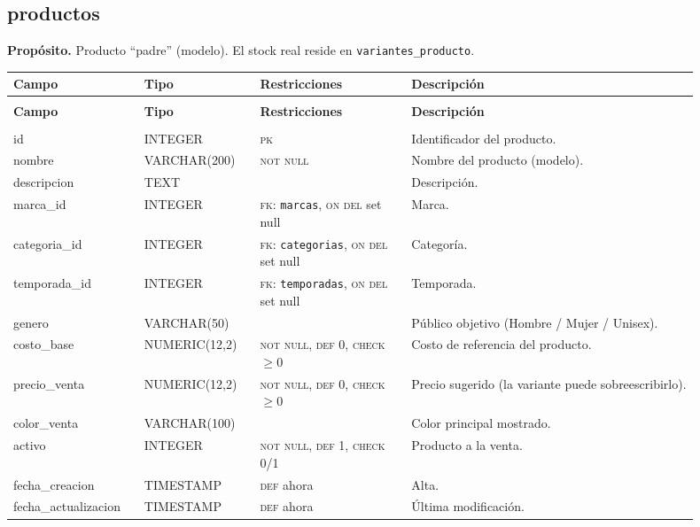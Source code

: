 \documentclass[11pt]{article}
\makeatletter
\newenvironment{campos}{%
  \par\footnotesize
  \setlength{\LTpre}{0.3ex}\setlength{\LTpost}{0.6ex}
  \begin{longtable}{@{}>{\ttfamily}p{0.165\linewidth} >{\ttfamily}p{0.150\linewidth} p{0.205\linewidth} >{\raggedright\arraybackslash}p{0.385\linewidth}@{}}
  \toprule
  \normalfont\bfseries Campo & \normalfont\bfseries Tipo & \normalfont\bfseries Restricciones & \normalfont\bfseries Descripción \\
  \midrule \endfirsthead
  \multicolumn{4}{@{}l}{\footnotesize\itshape \dots\ continuación}\\[0.3ex]
  \toprule
  \normalfont\bfseries Campo & \normalfont\bfseries Tipo & \normalfont\bfseries Restricciones & \normalfont\bfseries Descripción \\
  \midrule \endhead
  \midrule \multicolumn{4}{r@{}}{\footnotesize\itshape continúa en la siguiente página}\\ \endfoot
  \bottomrule \endlastfoot
}{%
  \end{longtable}\par
}
\newcommand{\proposito}[1]{\par\vspace{0.2ex}\noindent\colorbox{brandlight}{\parbox{\dimexpr\linewidth-2\fboxsep}{\small\textbf{Propósito.} #1}}\par\vspace{0.8ex}}
\newcommand{\pk}{\textsc{pk}}
\newcommand{\fk}[1]{\textsc{fk}: \texttt{#1}}
\newcommand{\nn}{\textsc{not null}}
\makeatother
\begin{document}
\subsection{productos}
\proposito{Producto ``padre'' (modelo). El stock real reside en \texttt{variantes\_producto}.}
\begin{campos}
id                  & INTEGER       & \pk{}    & Identificador del producto. \\
nombre              & VARCHAR(200)  & \nn      & Nombre del producto (modelo). \\
descripcion         & TEXT          &          & Descripción. \\
marca\_id           & INTEGER       & \fk{marcas}, \textsc{on del} set null & Marca. \\
categoria\_id       & INTEGER       & \fk{categorias}, \textsc{on del} set null & Categoría. \\
temporada\_id       & INTEGER       & \fk{temporadas}, \textsc{on del} set null & Temporada. \\
genero              & VARCHAR(50)   &          & Público objetivo (Hombre / Mujer / Unisex). \\
costo\_base         & NUMERIC(12,2) & \nn, \textsc{def} 0, \textsc{check} $\geq 0$ & Costo de referencia del producto. \\
precio\_venta       & NUMERIC(12,2) & \nn, \textsc{def} 0, \textsc{check} $\geq 0$ & Precio sugerido (la variante puede sobreescribirlo). \\
color\_venta        & VARCHAR(100)  &          & Color principal mostrado. \\
activo              & INTEGER       & \nn, \textsc{def} 1, \textsc{check} 0/1 & Producto a la venta. \\
fecha\_creacion     & TIMESTAMP     & \textsc{def} ahora & Alta. \\
fecha\_actualizacion & TIMESTAMP    & \textsc{def} ahora & Última modificación. \\
\end{campos}
\end{document}
